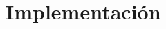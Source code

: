 \documentclass[10pt,letterpaper]{report}
\begin{document}
\part{Implementación}%










%





%

\appendix
%


\end{document}
